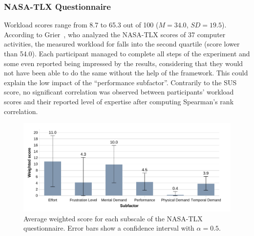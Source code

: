 \subsubsection{NASA-TLX Questionnaire}
Workload scores range from 8.7 to 65.3 out of 100 ($M{=}34.0$, $SD{=}19.5$). According to Grier~\cite{Grier:2015}, who analyzed the NASA-TLX scores of 37 computer activities, the measured workload for \ql falls into the second quartile (score lower than 54.0). Each participant managed to complete all steps of the experiment and some even reported being impressed by the results, considering that they would not have been able to do the same without the help of the framework. This could explain the low impact of the ``performance subfactor''. 
 Contrarily to the SUS score, no significant correlation was observed between participants' workload scores and their reported level of expertise after computing Spearman's rank correlation.

\begin{figure}[t]
    \centering
    \includegraphics[width=\linewidth]{Figures/QuantumLeap/Evaluation/NASA-TLX-scores.pdf}
    \vspace{-8pt}
    \caption{Average weighted score for each subscale of the NASA-TLX questionnaire. Error bars show a confidence interval with $\alpha{=}0.5$.}
    \label{fig:quantumleap:nasa-tlx-scores}
\end{figure}

